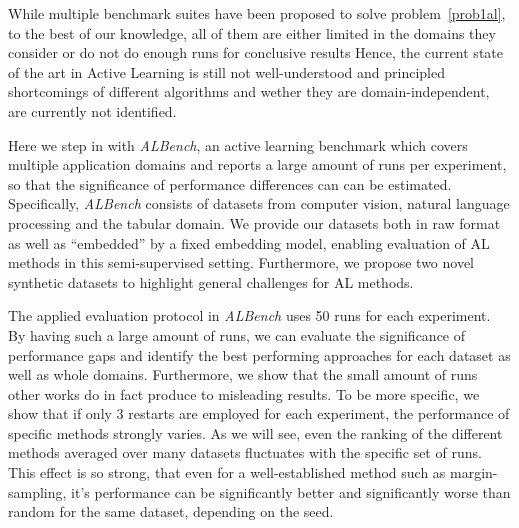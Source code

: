 \documentclass[]{article}
\begin{document}
While multiple benchmark suites have been proposed to solve
problem~\ref{prob1al}, to the best of
our knowledge, all of them are either limited in the domains they consider or do
not do enough runs for conclusive results 
Hence, the current
state of the art in Active Learning is still not well-understood and principled
shortcomings of different algorithms and wether they are 
domain-independent, are currently not identified.

Here we step in with \emph{ALBench}, an active learning benchmark which covers
multiple application domains and reports a large amount of runs per
experiment, so that the significance of performance differences can can be
estimated. Specifically, \emph{ALBench} consists of datasets from
computer vision, natural language processing and the tabular domain. We provide
our datasets both in raw format %
as well as ``embedded'' by a fixed embedding model, enabling evaluation of AL methods in
this semi-supervised setting.
Furthermore, we propose two novel synthetic datasets to highlight general
challenges for AL methods.

The applied evaluation protocol in \emph{ALBench} uses 50 runs for
each experiment. By having such a large amount of runs, we can evaluate the
significance of performance gaps and identify the best performing
approaches for each dataset as well as whole domains. 
Furthermore, we show that the small amount of runs other works do in fact 
produce to misleading results. 
To be more specific, we show that if only 3 restarts are employed for each experiment, 
the performance of specific methods strongly varies. As we will see, even the ranking of
the different methods averaged over many datasets fluctuates with the specific set of runs. 
This effect is so strong, that even for a well-established method such
as margin-sampling, it's performance can be significantly better and significantly
worse than random for the same dataset, depending on the seed. 
\end{document}
